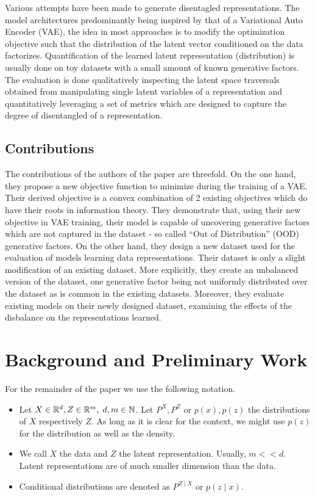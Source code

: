 \documentclass[twoside,11pt]{article}
\newcommand{\N}{\mathbb{N}}
\newcommand{\R}{\mathbb{R}}
\begin{document}
Various attempts have been made to generate disentagled representations. The model architectures predominantly being inspired by that of a Variational Auto Encoder (VAE), the idea in most approaches is to modify the optimization objective such that the distribution of the latent vector conditioned on the data factorizes.
Quantification of the learned latent representation (distribution) is usually done on toy datasets with a small amount of known generative factors. The evaluation is done qualitatively inspecting the latent space traversals obtained from manipulating single latent variables of a representation and quantitatively leveraging a set of metrics which are designed to capture the degree of disentangled of a representation.

\subsection{Contributions}
The contributions of the authors of the paper are threefold. On the one hand, they propose a new objective function to minimize during the training of a VAE. Their derived objective is a convex combination of 2 existing objectives which do have their roots in information theory.
They demonstrate that, using their new objective in VAE training, their model is capable of uncovering generative factors which are not captured in the dataset - so called \enquote{Out of Distribution} (OOD) generative factors.
On the other hand, they design a new dataset used for the evaluation of models learning data representations. Their dataset is only a slight modification of an existing dataset. More explicitly, they create an unbalanced version of the dataset, one generative factor being not uniformly distributed over the dataset as is common in the existing datasets.
Moreover, they evaluate existing models on their newly designed dataset, examining the effects of the disbalance on the representations learned.

\section{Background and Preliminary Work}
For the remainder of the paper we use the following notation.
\begin{itemize}
  \item Let $X \in \R^{d}, Z \in \R^{m}, \hspace{0.1 cm} d,m \in \N$. Let $P^{X}, P^{Z}$ or $p(x), p(z)$ the distributions of $X$ respectively $Z$. As long as it is clear for the context, we might use $p(z)$ for the distribution as well as the density.
  \item We call $X$ the data and $Z$ the latent representation. Usually, $m << d$. Latent representations are of much smaller dimension than the data.
  \item Conditional distributions are denoted as $P^{Z \mid X}$ or $p(z \mid x)$.
\end{itemize}
\end{document}
